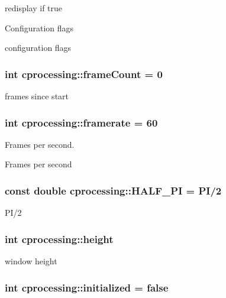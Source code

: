 redisplay if true 

\-Configuration flags

configuration flags \hypertarget{namespacecprocessing_aca5f2a565e0aca50db1f6d5aa4a4b33d}{
\subsubsection[{frame\-Count}]{\setlength{\rightskip}{0pt plus 5cm}int {\bf cprocessing\-::frame\-Count} = 0}}\label{namespacecprocessing_aca5f2a565e0aca50db1f6d5aa4a4b33d}
frames since start \hypertarget{namespacecprocessing_a7d27ffd61ab47bccc92ab035094e69ee}{
\subsubsection[{framerate}]{\setlength{\rightskip}{0pt plus 5cm}int {\bf cprocessing\-::framerate} = 60}}\label{namespacecprocessing_a7d27ffd61ab47bccc92ab035094e69ee}


\-Frames per second. 

\-Frames per second \hypertarget{namespacecprocessing_a257bee644c97e92e9f9492c569ab863d}{
\subsubsection[{\-H\-A\-L\-F\-\_\-\-P\-I}]{\setlength{\rightskip}{0pt plus 5cm}const double {\bf cprocessing\-::\-H\-A\-L\-F\-\_\-\-P\-I} = {\bf \-P\-I}/2}}\label{namespacecprocessing_a257bee644c97e92e9f9492c569ab863d}
\-P\-I/2 \hypertarget{namespacecprocessing_ac392753eef02e2ad4ad84f5a076919be}{
\subsubsection[{height}]{\setlength{\rightskip}{0pt plus 5cm}int {\bf cprocessing\-::height}}}\label{namespacecprocessing_ac392753eef02e2ad4ad84f5a076919be}


window height 

\hypertarget{namespacecprocessing_abe1272b16cf18357f89ae10c184fbcd2}{
\subsubsection[{initialized}]{\setlength{\rightskip}{0pt plus 5cm}int {\bf cprocessing\-::initialized} = false}}\label{namespacecprocessing_abe1272b16cf18357f89ae10c184fbcd2}


